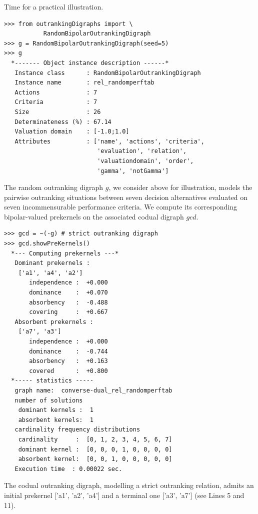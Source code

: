 Time for a practical illustration.
\begin{lstlisting}
>>> from outrankingDigraphs import \
           RandomBipolarOutrankingDigraph
>>> g = RandomBipolarOutrankingDigraph(seed=5)
>>> g
  *------- Object instance description ------*
   Instance class      : RandomBipolarOutrankingDigraph
   Instance name       : rel_randomperftab
   Actions             : 7
   Criteria            : 7
   Size                : 26
   Determinateness (%) : 67.14
   Valuation domain    : [-1.0;1.0]
   Attributes          : ['name', 'actions', 'criteria',
                          'evaluation', 'relation',
                          'valuationdomain', 'order',
                          'gamma', 'notGamma']
\end{lstlisting}
The random outranking digraph $g$, we consider above for illustration, models the pairwise outranking situations between seven decision alternatives evaluated on seven incommensurable performance criteria. We compute its corresponding bipolar-valued prekernels on the associated codual digraph $gcd$.
\begin{lstlisting}
>>> gcd = ~(-g) # strict outranking digraph
>>> gcd.showPreKernels()
  *--- Computing prekernels ---*
   Dominant prekernels :
    ['a1', 'a4', 'a2']
       independence :  +0.000
       dominance    :  +0.070
       absorbency   :  -0.488
       covering     :  +0.667
   Absorbent prekernels :
    ['a7', 'a3']
       independence :  +0.000
       dominance    :  -0.744
       absorbency   :  +0.163
       covered      :  +0.800
  *----- statistics -----
   graph name:  converse-dual_rel_randomperftab
   number of solutions
    dominant kernels :  1
    absorbent kernels:  1
   cardinality frequency distributions
    cardinality     :  [0, 1, 2, 3, 4, 5, 6, 7]
    dominant kernel :  [0, 0, 0, 1, 0, 0, 0, 0]
    absorbent kernel:  [0, 0, 1, 0, 0, 0, 0, 0]
   Execution time  : 0.00022 sec.
\end{lstlisting}
The codual outranking digraph, modelling a strict outranking relation, admits an initial prekernel ['a1', 'a2', 'a4'] and a terminal one ['a3', 'a7'] (see Lines 5 and 11).

